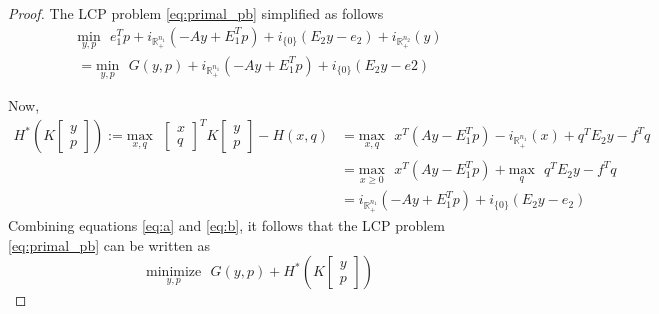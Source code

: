 \documentclass{article} %
\begin{document}
\begin{proof}
  The LCP problem \eqref{eq:primal_pb} simplified as follows
\begin{equation}
  \begin{aligned}
    \underset{y,p}{\text{min}}\text{ }e_1^Tp + i_{\mathbb{R}^{n_1}_+}(-Ay + E_1^Tp) + i_{\{0\}}(E_2y - e_2) + i_{\mathbb{R}^{n_2}_+}(y)\\
    = \underset{y,p}{\text{min}}\text{ }G(y,p) + i_{\mathbb{R}^{n_1}_+}(-Ay + E_1^Tp) + i_{\{0\}}(E_2y - e2)
  \end{aligned}
  \label{eq:a}
\end{equation}

Now,
\begin{equation}
  \begin{split}
    H^*\left(K\begin{bmatrix}y\\p\end{bmatrix}\right) := \underset{x,q}{\text{max}}\text{ }\begin{bmatrix}x\\q\end{bmatrix}^TK\begin{bmatrix}y\\p\end{bmatrix} - H(x, q) &= \underset{x, q}{\text{max}}\text{ }x^T(Ay - E_1^Tp) - i_{\mathbb{R}^{n_1}_+}(x) + q^TE_2y - f^Tq\\
      &= \underset{x \geq 0}{\text{max}}\text{ }x^T(Ay - E_1^Tp) + \underset{q}{\text{max}}\text{ }q^TE_2y - f^Tq\\
      &= i_{\mathbb{R}^{n_1}_+}(-Ay + E_1^Tp) + i_{\{0\}}(E_2y - e_2)
  \end{split}
  \label{eq:b}
\end{equation}
Combining equations \eqref{eq:a} and \eqref{eq:b}, it follows that the LCP problem \eqref{eq:primal_pb} can be written as 
\begin{equation}
  \underset{y,p}{\text{minimize}}\text{ }G(y,p) + H^*\left(K\begin{bmatrix}y\\p\end{bmatrix}\right)
\end{equation}


\end{proof}
\end{document}
